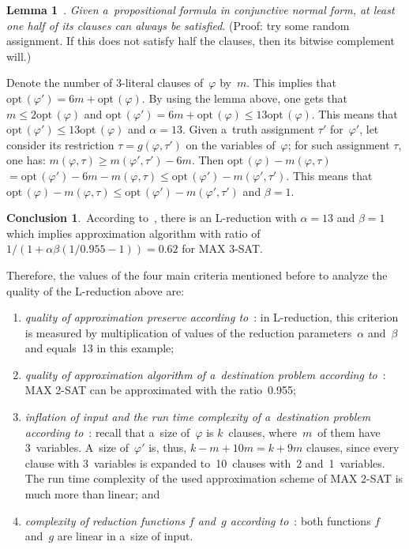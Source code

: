 \begin{multicols}{2}
\smallskip

\noindent
\textbf{Lemma 1}~\cite{AP2005}.
\textit{Given a~propositional formula in conjunctive normal form, at least
one half of its clauses can always be satisfied}. (Proof: try some
random assignment. If this does not satisfy half the clauses, then
its bitwise complement will.)


\smallskip

Denote the number of 3-literal clauses of~$\varphi$ by~$m$. This
implies that $\mathrm{opt}\,(\varphi') = 6m + \mathrm{opt}\,(\varphi)$. By using the lemma
above, one gets that $m \leq 2\mathrm{opt}\,(\varphi)$ and $\mathrm{opt}\,(\varphi') = 6m +
\mathrm{opt}\,(\varphi) \leq 13\mathrm{opt}\,(\varphi)$. This means that
$\mathrm{opt}\,(\varphi')
\leq 13\mathrm{opt}\,(\varphi)$ and $\alpha = 13$. Given a~truth assignment
$\tau'$ for~$\varphi'$, let consider its restriction $\tau =
g(\varphi,\tau')$ on the variables of~$\varphi$; for such assignment
$\tau$, one has: $m(\varphi,\tau) \geq m(\varphi',\tau') - 6m$. Then
$\mathrm{opt}\,(\varphi) - m(\varphi,\tau)$\linebreak $ = \mathrm{opt}\,(\varphi') - 6m -
m(\varphi,\tau) \leq \mathrm{opt}\,(\varphi') - m(\varphi',\tau')$. This means
that $\mathrm{opt}\,(\varphi) - m(\varphi,\tau) \leq \mathrm{opt}\,(\varphi') -
m(\varphi',\tau')$ and $\beta = 1$.

\smallskip

\noindent
\textbf{Conclusion 1}.\ According to~\cite{AP2005}, there is an L-reduction
with $\alpha=13$ and $\beta=1$ which implies approximation
algorithm with ratio of $1/(1+\alpha\beta (1/0.955-1)) = 0.62$
for MAX 3-SAT.

\smallskip

Therefore, the values of the four main criteria mentioned
before to analyze the quality of the L-reduction above are:
\begin{enumerate}[(1)]
\item {\it quality of approximation preserve according
to}~\cite{AP2005}: in L-reduction, this criterion is measured by
multiplication of values of the reduction parameters~$\alpha$ and~$\beta$
and equals~13 in this example;
\item {\it quality of approximation algorithm of a~destination
problem according to}~\cite{H1997}: {MAX 2-SAT} can be
approximated with the ratio~0.955;
\item {\it inflation of input and the run time complexity of a~destination problem according
to}~\cite{AP2005}: recall that a~size
of~$\varphi$ is $k$~clauses, where~$m$~of them have 3~variables. A~size
of~$\varphi'$ is, thus, $k - m + 10m = k + 9m$ clauses, since
every clause with 3~variables is expanded to~10~clauses with~2 and~1~variables. The run time complexity
of the used approximation scheme of {MAX 2-SAT} is much more than
linear; and
\item {\it complexity of reduction functions $f$ and~$g$
according to}~\cite{AP2005}: both functions $f$ and~$g$ are linear
in a~size of input.
\end{enumerate}


\end{multicols}
